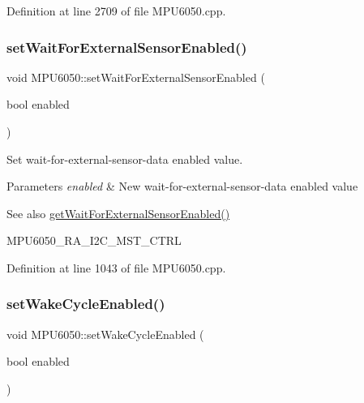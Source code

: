 Definition at line 2709 of file M\+P\+U6050.\+cpp.

\mbox{\label{classMPU6050_a20dc4bdedbe1550580c28a6d090291be}} 
\subsubsection{\texorpdfstring{setWaitForExternalSensorEnabled()}{setWaitForExternalSensorEnabled()}}
{\footnotesize\ttfamily void M\+P\+U6050\+::set\+Wait\+For\+External\+Sensor\+Enabled (\begin{DoxyParamCaption}\item[{bool}]{enabled }\end{DoxyParamCaption})}



Set wait-\/for-\/external-\/sensor-\/data enabled value. 


\begin{DoxyParams}{Parameters}
{\em enabled} & New wait-\/for-\/external-\/sensor-\/data enabled value \\
\hline
\end{DoxyParams}
\begin{DoxySeeAlso}{See also}
\mbox{\hyperlink{classMPU6050_a4e2ebda47b85b4c5463f041c790bf5c0}{get\+Wait\+For\+External\+Sensor\+Enabled()}} 

M\+P\+U6050\+\_\+\+R\+A\+\_\+\+I2\+C\+\_\+\+M\+S\+T\+\_\+\+C\+T\+RL 
\end{DoxySeeAlso}


Definition at line 1043 of file M\+P\+U6050.\+cpp.

\mbox{\label{classMPU6050_a340eade71cf6286f6904c2021330944e}} 
\subsubsection{\texorpdfstring{setWakeCycleEnabled()}{setWakeCycleEnabled()}}
{\footnotesize\ttfamily void M\+P\+U6050\+::set\+Wake\+Cycle\+Enabled (\begin{DoxyParamCaption}\item[{bool}]{enabled }\end{DoxyParamCaption})}



